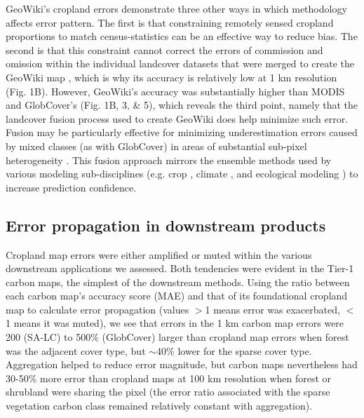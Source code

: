 \documentclass[a4paper]{article}
\begin{document}
GeoWiki's cropland errors demonstrate three other ways in which methodology affects error pattern. The first is that constraining remotely sensed cropland proportions to match census-statistics \citep{fritz_mapping_2015,fritz_highlighting_2011} can be an effective way to reduce bias. The second is that this constraint cannot correct the errors of commission and omission within the individual landcover datasets that were merged to create the GeoWiki map \citep{fritz_mapping_2015}, which is why its accuracy is relatively low at 1 km resolution (Fig. 1B). However, GeoWiki's accuracy was substantially higher than MODIS and GlobCover's (Fig. 1B, 3, \& 5), which reveals the third point, namely that the landcover fusion process used to create GeoWiki does help minimize such error.  Fusion may be particularly effective for minimizing underestimation errors caused by mixed classes (as with GlobCover) in areas of substantial sub-pixel heterogeneity \citep{fritz_mapping_2015,tuanmu_global_2014}.  This fusion approach mirrors the ensemble methods used by various modeling sub-disciplines (e.g. crop \citep{asseng_uncertainty_2013}, climate \citep{giorgi_calculation_2002}, and ecological modeling \citep{araujo_ensemble_2007}) to increase prediction confidence.

\vspace{-0.3 cm}
\subsection*{Error propagation in downstream products}
\vspace{-0.2 cm}
Cropland map errors were either amplified or muted within the various downstream applications we assessed. Both tendencies were evident in the Tier-1 carbon maps, the simplest of the downstream methods. Using the ratio between each carbon map's accuracy score (MAE) and that of its foundational cropland map to calculate error propagation (values $>$1 means error was exacerbated, $<$1 means it was muted), we see that errors in the 1 km carbon map errors were 200 (SA-LC) to 500\% (GlobCover) larger than cropland map errors when forest was the adjacent cover type, but $\sim$40\% lower for the sparse cover type.  Aggregation helped to reduce error magnitude, but carbon maps nevertheless had 30-50\% more error than cropland maps at 100 km resolution when forest or shrubland were sharing the pixel (the error ratio associated with the sparse vegetation carbon class remained relatively constant with aggregation).  
\end{document}
